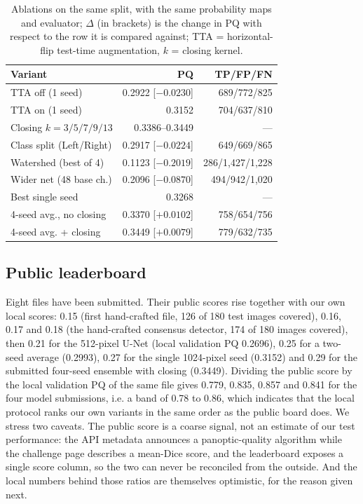 \documentclass[sigconf]{acmart}
\begin{document}
\begin{table}[t]
\footnotesize
\setlength{\tabcolsep}{3.2pt}
\caption{Ablations on the same split, with the same probability maps and
evaluator; $\Delta$ (in brackets) is the change in PQ with respect to the row it
is compared against; TTA = horizontal-flip test-time augmentation,
$k$ = closing kernel.}
\label{tab:abl}
\begin{tabular}{lrr}
\toprule
Variant & PQ & TP/FP/FN \\
\midrule
TTA off (1 seed) & 0.2922 [$-0.0230$] & 689/772/825 \\
TTA on (1 seed) & 0.3152 & 704/637/810 \\
Closing $k=3/5/7/9/13$ & 0.3386--0.3449 & --- \\
Class split (Left/Right) & 0.2917 [$-0.0224$] & 649/669/865 \\
Watershed (best of 4) & 0.1123 [$-0.2019$] & 286/1{,}427/1{,}228 \\
Wider net (48 base ch.) & 0.2096 [$-0.0870$] & 494/942/1{,}020 \\
Best single seed & 0.3268 & --- \\
4-seed avg., no closing & 0.3370 [$+0.0102$] & 758/654/756 \\
4-seed avg. + closing & 0.3449 [$+0.0079$] & 779/632/735 \\
\bottomrule
\end{tabular}
\end{table}

\subsection{Public leaderboard}
Eight files have been submitted. Their public scores rise together with our own
local scores: 0.15 (first hand-crafted file, 126 of 180 test images covered),
0.16, 0.17 and 0.18 (the hand-crafted consensus detector, 174 of 180 images
covered), then 0.21 for the 512-pixel U-Net (local validation PQ 0.2696), 0.25
for a two-seed average (0.2993), 0.27 for the single 1024-pixel seed (0.3152)
and 0.29 for the submitted four-seed ensemble with closing (0.3449).
Dividing the public score by the local validation PQ of the same file gives
0.779, 0.835, 0.857 and 0.841 for
the four model submissions, i.e. a band of 0.78 to 0.86, which indicates that
the local protocol ranks our own variants in the same order as the public
board does.
We stress two caveats. The public score is a coarse signal, not an estimate of
our test performance: the API metadata announces a panoptic-quality
algorithm while the challenge page describes a mean-Dice score, and the
leaderboard exposes a single score column, so the two can never be reconciled
from the outside. And the local numbers behind those ratios are themselves
optimistic, for the reason given next.
\end{document}
